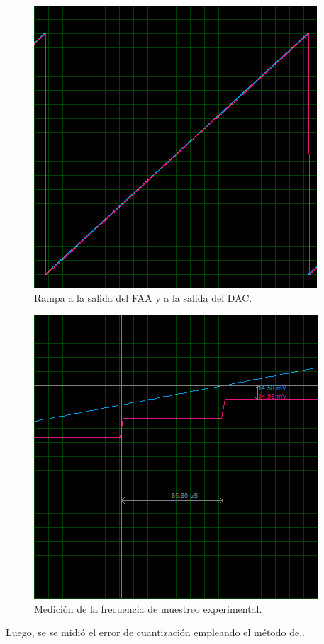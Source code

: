 \begin{figure}[H]
\centering
\includegraphics[width=0.8\linewidth]{ImagenesEjercicio1/rampa1.png}
\caption{Rampa a la salida del FAA y a la salida del DAC.}
\label{med1}
\end{figure}

\begin{figure}[H]
\centering
\includegraphics[width=0.8\linewidth]{ImagenesEjercicio1/rampa1zoom.png}
\caption{Medición de la frecuencia de muestreo experimental.}
\label{med2}
\end{figure}

Luego, se se midió el error de cuantización empleando el método de..

